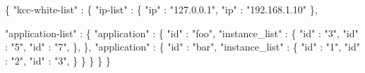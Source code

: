 \begin{DoxyCode}
\{
  \textcolor{stringliteral}{"kcc-white-list"} : \{
    \textcolor{stringliteral}{"ip-list"}      : \{
      \textcolor{stringliteral}{"ip"} : \textcolor{stringliteral}{"127.0.0.1"},
      \textcolor{stringliteral}{"ip"} : \textcolor{stringliteral}{"192.168.1.10"}
    \},

    \textcolor{stringliteral}{"application-list"} : \{
      \textcolor{stringliteral}{"application"} : \{
        \textcolor{stringliteral}{"id"}            : \textcolor{stringliteral}{"foo"},
        \textcolor{stringliteral}{"instance\_list"} : \{
          \textcolor{stringliteral}{"id"} : \textcolor{stringliteral}{"3"},
          \textcolor{stringliteral}{"id"} : \textcolor{stringliteral}{"5"},
          \textcolor{stringliteral}{"id"} : \textcolor{stringliteral}{"7"},
        \},
      \},
      \textcolor{stringliteral}{"application"} : \{
        \textcolor{stringliteral}{"id"}            : \textcolor{stringliteral}{"bar"},
        \textcolor{stringliteral}{"instance\_list"} : \{
          \textcolor{stringliteral}{"id"} : \textcolor{stringliteral}{"1"},
          \textcolor{stringliteral}{"id"} : \textcolor{stringliteral}{"2"},
          \textcolor{stringliteral}{"id"} : \textcolor{stringliteral}{"3"},
        \}
      \}
    \}
  \}
\}
\end{DoxyCode}
 